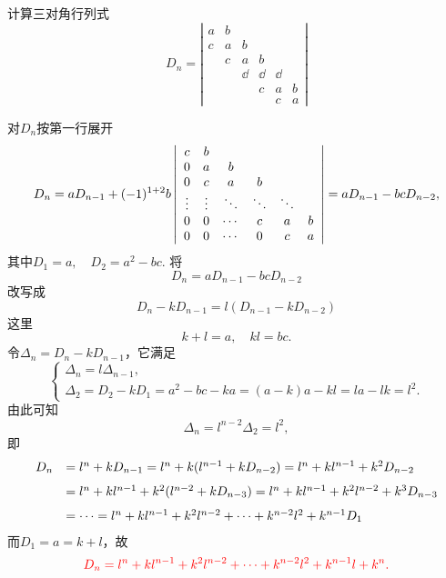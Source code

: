 \begin{li}
  计算三对角行列式
  $$
  D_n = \left|
    \begin{array}{cccccc}
      a & b & &&&\\
      c&a&b&&&\\
        &c&a&b&&\\
        &&\dd&\dd&\dd&\\
        &&&c&a&b\\
        &&&&c&a
    \end{array}
  \right|
  $$
\end{li}
\begin{jie}
  对$D_n$按第一行展开
  $$
  D_n =  aD_{n-1} + (-1)^{1+2} b \left|
    \begin{array}{cccccc}
      c&b&&&&\\
      0&a&b&&&\\
      0&c&a&b&&\\
      \vdots&\vdots&\ddots&\ddots&\ddots&\\
      0&0&\cdots&c&a&b\\
      0&0&\cdots&0&c&a
    \end{array}
  \right|  = a D_{n-1} - bc D_{n-2},
  $$
  其中$D_1=a, \quad D_2=a^2-bc$.
  将　
  $$D_n = a D_{n-1} - bc D_{n-2}$$
  改写成 
  $$
  D_n - k D_{n-1} = l(D_{n-1} - k D_{n-2})
  $$ 
  这里
  $$
  k+l=a, \quad kl = bc.
  $$    
  令$\Delta_n = D_n-kD_{n-1}$，它满足
  $$
  \left\{
    \begin{array}{l}
      \Delta_n = l\Delta_{n-1},  \\[0.05in] 
      \Delta_2 = D_2-kD_1 = a^2-bc - ka = (a-k)a-kl=la-lk=l^2.
    \end{array}    
  \right.
  $$ 
  由此可知
  $$
  \Delta_n = l^{n-2} \Delta_2 = l^2, 
  $$
  即
  $$
  \begin{array}{rl}
    D_n &  = l^n  + k D_{n-1}  = l^n  + k (l^{n-1}  + k D_{n-2}) 
          = l^n  + k l^{n-1}  + k^2 D_{n-2} \\[0.1in]
        & =  l^n  + k l^{n-1}  + k^2 (l^{n-2}  + k D_{n-3} )
          = l^n  + k l^{n-1}  + k^2 l^{n-2}  + k^3 D_{n-3} \\[0.1in]
        & = \cdots  =  l^n  + k l^{n-1}  + k^2 l^{n-2}  + \cdots + k^{n-2}l^2 + k^{n-1} D_1
  \end{array}
  $$ 
  而$D_1 = a = k+l$，故
  $$
  \textcolor{red}{
    D_n = l^n  + k l^{n-1}  + k^2 l^{n-2}  + \cdots + k^{n-2}l^2 + k^{n-1}l + k^n.
  }
  $$

\end{jie}
